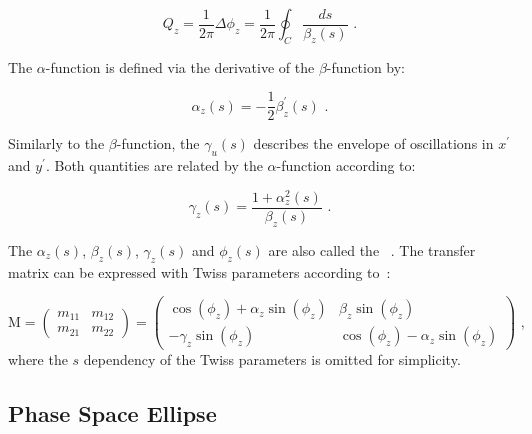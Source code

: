 \begin{equation}
    Q_z = \frac{1}{2 \pi} \Delta \phi_z = \frac{1}{2 \pi} \oint_C \dfrac{ds}{\beta_z (s)} \text{ .}
    \label{equation:tune_definition}
\end{equation}

The \(\alpha\)-function is defined via the derivative of the \(\beta\)-function by:

\begin{equation}
    \alpha_z(s) = - \frac{1}{2} \beta^{\prime}_z(s) \text{ .}
    \label{equation:alpha_function}
\end{equation}

Similarly to the \(\beta\)-function, the  \(\gamma_u(s)\) describes the envelope of oscillations in \(x^{\prime}\) and \(y^{\prime}\).
Both quantities are related by the \(\alpha\)-function according to:

\begin{equation}
    \gamma_z(s) = \frac{1 + \alpha_z^2(s)}{\beta_z(s)} \text{ .}
    \label{equation:gamma_function}
\end{equation}

The \(\alpha_z(s)\), \(\beta_z(s)\), \(\gamma_z(s)\) and \(\phi_z(s)\) are also called the ~\cite{RSI:Twiss:Orbital_Stability_Proton_Synchrotron}.
The transfer matrix can be expressed with Twiss parameters according to~\cite{AOP:COURANT:Theory_Alternating_Gradient_Synchrotron}:

\begin{equation}
    \mathrm{M} = 
    \left( 
    \begin{array}{ll}
        m_{11} & m_{12} \\
        m_{21} & m_{22}
    \end{array} \right) 
    = 
    \left(
    \begin{array}{cc}
        \cos \left( \phi_z \right) + \alpha_z \sin \left( \phi_z \right) & \beta_z \sin \left( \phi_z \right) \\
        - \gamma_z \sin \left( \phi_z \right)                            & \cos \left( \phi_z \right) - \alpha_z \sin \left( \phi_z \right)
    \end{array} 
    \right) \text{ ,}
    \label{equation:transfer_matrix_twiss_parameters}
\end{equation}
where the \(s\) dependency of the Twiss parameters is omitted for simplicity.

\subsection{Phase Space Ellipse}
\label{subsection:phase_space_ellipse}

